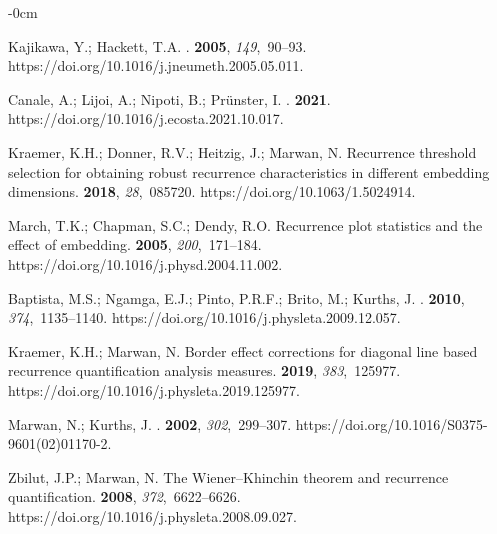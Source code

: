 \documentclass[entropy,article,accept,pdftex,moreauthors]{Definitions/mdpi}
\begin{document}
\begin{adjustwidth}{-\extralength}{0cm}
\begin{thebibliography}{999}
Kajikawa, Y.; Hackett, T.A.
.
 {\bf 2005}, {\em 149},~90--93.
\newblock
  {https://doi.org/10.1016/j.jneumeth.2005.05.011}.

Canale, A.; Lijoi, A.; Nipoti, B.; Pr{\"{u}}nster, I.
.
 {\bf 2021}.
\newblock
  {https://doi.org/10.1016/j.ecosta.2021.10.017}.

Kraemer, K.H.; Donner, R.V.; Heitzig, J.; Marwan, N.
\newblock Recurrence threshold selection for obtaining robust recurrence
  characteristics in different embedding dimensions.
 {\bf
  2018}, {\em 28},~085720.
\newblock
  {https://doi.org/10.1063/1.5024914}.

March, T.K.; Chapman, S.C.; Dendy, R.O.
\newblock Recurrence plot statistics and the effect of embedding.
 {\bf 2005}, {\em 200},~171--184.
\newblock
  {https://doi.org/10.1016/j.physd.2004.11.002}.

Baptista, M.S.; Ngamga, E.J.; Pinto, P.R.F.; Brito, M.; Kurths, J.
.
 {\bf 2010}, {\em 374},~1135--1140.
\newblock
 {https://doi.org/10.1016/j.physleta.2009.12.057}.

Kraemer, K.H.; Marwan, N.
\newblock Border effect corrections for diagonal line based recurrence
  quantification analysis measures.
 {\bf 2019}, {\em 383},~125977.
\newblock
 {https://doi.org/10.1016/j.physleta.2019.125977}.

Marwan, N.; Kurths, J.
.
 {\bf 2002}, {\em 302},~299--307.
\newblock
  {https://doi.org/10.1016/S0375-9601(02)01170-2}.

Zbilut, J.P.; Marwan, N.
\newblock The Wiener–Khinchin theorem and recurrence quantification.
 {\bf 2008}, {\em 372},~6622--6626.
\newblock
 {https://doi.org/10.1016/j.physleta.2008.09.027}.


\end{thebibliography}
\end{adjustwidth}
\end{document}
